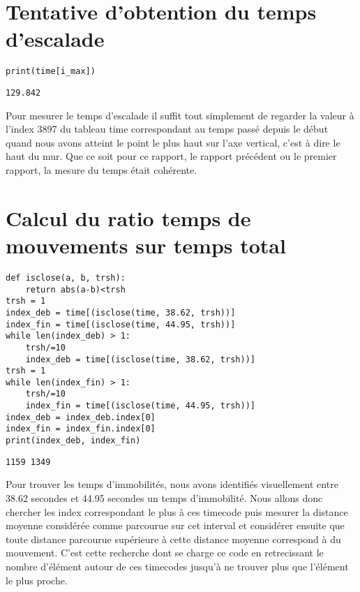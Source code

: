 \documentclass[11pt]{article}
\begin{document}
\begin{center}

\end{center}
\section{Tentative d'obtention du temps d'escalade}
\label{sec:orgbde7ee3}
\begin{verbatim}
print(time[i_max])
\end{verbatim}

\label{org8e4fc55}
\begin{verbatim}
129.842
\end{verbatim}


Pour mesurer le temps d'escalade il suffit tout simplement de regarder la valeur à l'index 3897 du tableau time correspondant au temps passé depuis le
début quand nous avons atteint le point le plus haut sur l'axe vertical, c'est à dire le haut du mur. Que ce soit pour ce rapport, le rapport
précédent ou le premier rapport, la mesure du temps était cohérente.
\section{Calcul du ratio temps de mouvements sur temps total}
\label{sec:orgb53298a}

\begin{verbatim}
def isclose(a, b, trsh):
    return abs(a-b)<trsh
trsh = 1
index_deb = time[(isclose(time, 38.62, trsh))]
index_fin = time[(isclose(time, 44.95, trsh))]
while len(index_deb) > 1:
    trsh/=10
    index_deb = time[(isclose(time, 38.62, trsh))]
trsh = 1
while len(index_fin) > 1:
    trsh/=10
    index_fin = time[(isclose(time, 44.95, trsh))]
index_deb = index_deb.index[0]
index_fin = index_fin.index[0]
print(index_deb, index_fin)
\end{verbatim}

\label{org124e2f6}
\begin{verbatim}
1159 1349
\end{verbatim}


Pour trouver les temps d'immobilités, nous avons identifiés visuellement entre 38.62 secondes et 44.95 secondes un temps d'immobilité. Nous allons
donc chercher les index correspondant le plus à ces timecode puis mesurer la distance moyenne considérée comme parcourue sur cet interval et
considérer ensuite que toute distance parcourue supérieure à cette distance moyenne correspond à du mouvement. C'est cette recherche dont se charge ce
code en retrecissant le nombre d'élément autour de ces timecodes jusqu'à ne trouver plus que l'élément le plus proche.
\end{document}
